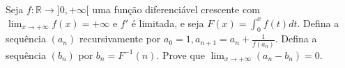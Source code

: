 Seja \(f\colon  \mathbb{R}\to ]0,+\infty[\) uma função diferenciável crescente com \(\lim_{x\rightarrow+\infty}f(x)=+\infty\) e \(f'\) é limitada, e seja \(F(x)=\int^x_0 f(t) dt\).
Defina a sequência \((a_n)\) recursivamente por \(a_0=1,a_{n+1}=a_n+\frac1{f(a_n)}\).
Defina a sequência \((b_n)\) por \(b_n=F^{-1}(n)\).
Prove que \(\lim_{x\rightarrow+\infty}(a_n-b_n)=0\).
